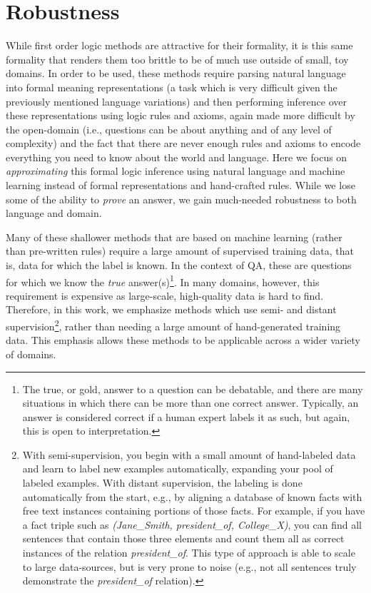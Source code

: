 \section{Robustness}
\label{sec:robustness}

While first order logic methods are attractive for their formality, it is this same formality that renders them too brittle to be of much use outside of small, toy domains.  In order to be used, these methods require parsing natural language into formal meaning representations (a task which is very difficult given the previously mentioned language variations) and then performing inference over these representations using logic rules and axioms, again made more difficult by the open-domain (i.e., questions can be about anything and of any level of complexity) and the fact that there are never enough rules and axioms to encode everything you need to know about the world and language.  Here we focus on \emph{approximating} this formal logic inference using natural language and machine learning instead of formal representations and hand-crafted rules.  While we lose some of the ability to \emph{prove} an answer, we gain much-needed robustness to both language and domain.

Many of these shallower methods that are based on machine learning  (rather than pre-written rules) require a large amount of supervised training data, that is, data for which the label is known.  In the context of QA, these are questions for which we know the \emph{true} answer(s)\footnote{The true, or gold, answer to a question can be debatable, and there are many situations in which there can be more than one correct answer.  Typically, an answer is considered correct if a human expert labels it as such, but again, this is open to interpretation.}. In many domains, however, this requirement is expensive as large-scale, high-quality data is hard to find.  Therefore, in this work, we emphasize methods which use semi- and distant supervision\footnote{With semi-supervision, you begin with a small amount of hand-labeled data and learn to label new examples automatically, expanding your pool of labeled examples.  With distant supervision, the labeling is done automatically from the start, e.g., by aligning a database of known facts with free text instances containing portions of those facts.  For example, if you have a fact triple such as \textit{(Jane\_Smith, president\_of, College\_X)}, you can find all sentences that contain those three elements and count them all as correct instances of the relation \textit{president\_of}.  This type of approach is able to scale to large data-sources, but is very prone to noise (e.g., not all sentences truly demonstrate the \textit{president\_of} relation).}, rather than needing a large amount of hand-generated training data.  This emphasis allows these methods to be applicable across a wider variety of domains.   

